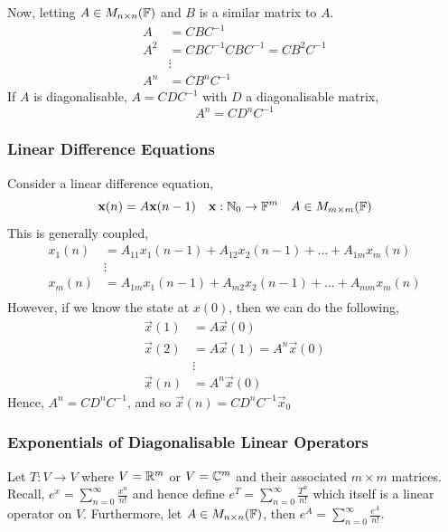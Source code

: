 \documentclass{article}
\begin{document}
Now, letting $A \in M_{n\times n}(\mathbb{F})$ and $B$ is a similar matrix to $A$.
\begin{align*}
  A &= CBC^{-1}\\
  A^2 &= CBC^{-1}CBC^{-1} = CB^2C^{-1}\\
  &\vdots\\
  A^n &= CB^nC^{-1}
\end{align*}
If $A$ is diagonalisable, $A = CDC^{-1}$ with $D$ a diagonalisable matrix,
$$ A^n = CD^nC^{-1} $$

\subsubsection{Linear Difference Equations}

Consider a linear difference equation,
$$ \boldsymbol{\mathbf{x}}(n) = A\boldsymbol{\mathbf{x}}(n-1) \quad \boldsymbol{\mathbf{x}} : \mathbb{N}_0 \to \mathbb{F}^m \quad A\in M_{m\times m}(\mathbb{F}) $$
This is generally coupled,
\begin{align*}
  x_1(n) &= A_{11}x_1(n-1) + A_{12}x_2(n-1) + \dots + A_{1m}x_m(n)\\
  &\vdots\\
  x_m(n) &= A_{1m}x_1(n-1) + A_{m2}x_2(n-1) + \dots + A_{mm}x_m(n)\\
\end{align*}
However, if we know the state at $x(0)$, then we can do the following,
\begin{align*}
  \vec x(1) &= A\vec x(0)\\
  \vec x(2) &= A\vec x(1) = A^n\vec x(0)\\
  &\vdots\\
  \vec x(n) &= A^n\vec x(0)
\end{align*}
Hence, $A^n = CD^nC^{-1}$, and so $\vec x(n) = CD^nC^{-1}\vec x_0$

\begin{center}
\end{center}

\subsubsection{Exponentials of Diagonalisable Linear Operators}
Let $T : V \to V$ where $V = \mathbb{R}^m$ or $V = \mathbb{C}^m$ and their associated $m\times m$ matrices.
Recall, $\displaystyle{e^x = \sum_{n=0}^\infty} \frac{x^n}{n!}$ and hence define $\displaystyle{e^T = \sum_{n=0}^\infty} \frac{T^n}{n!}$ which itself is a linear operator on $V$. Furthermore, let $A \in M_{n \times n}(\mathbb{F})$, then $\displaystyle{e^A = \sum_{n=0}^\infty} \frac{e^A}{n!}$.
\end{document}
